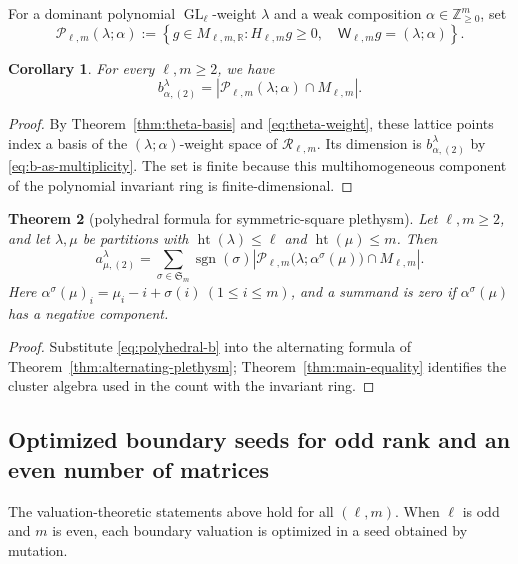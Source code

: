 \documentclass[11pt]{amsart}
\newtheorem{theorem}{Theorem}[section]
\newtheorem{corollary}[theorem]{Corollary}
\theoremstyle{definition}
\theoremstyle{remark}
\newcommand{\GL}{\operatorname{GL}}
\newcommand{\htp}{\operatorname{ht}}
\newcommand{\cR}{\mathcal R}
\newcommand{\frakS}{\mathfrak S}
\begin{document}
For a dominant polynomial $\GL_\ell$-weight $\lambda$ and a weak composition
$\alpha\in\mathbb Z_{\ge0}^m$, set
\[ \mathscr P_{\ell,m}(\lambda;\alpha) :=\left\{g\in M_{\ell,m,\mathbb R}: H_{\ell,m}g\ge0, \quad \mathsf W_{\ell,m}g=(\lambda;\alpha) \right\}. \]

\begin{corollary}\label{cor:polyhedral-b}
For every $\ell,m\ge2$, we have
\begin{equation}
 b_{\alpha,(2)}^\lambda
 =\left|\mathscr P_{\ell,m}(\lambda;\alpha)\cap M_{\ell,m}\right|.
 \label{eq:polyhedral-b}
\end{equation}
\end{corollary}

\begin{proof}
By Theorem~\ref{thm:theta-basis} and \eqref{eq:theta-weight}, these
lattice points index a basis of the $(\lambda;\alpha)$-weight space of
$\cR_{\ell,m}$.  Its dimension is $b_{\alpha,(2)}^\lambda$ by
\eqref{eq:b-as-multiplicity}.  The set is finite because this
multihomogeneous component of the polynomial invariant ring is
finite-dimensional.
\end{proof}

\begin{theorem}[polyhedral formula for symmetric-square plethysm]
\label{thm:polyhedral-plethysm}
Let $\ell,m\ge2$, and let $\lambda,\mu$ be partitions with
$\htp(\lambda)\le\ell$ and $\htp(\mu)\le m$.  Then
\[  a_{\mu,(2)}^\lambda =\sum_{\sigma\in\frakS_m}\operatorname{sgn}(\sigma) \left| \mathscr P_{\ell,m} \bigl(\lambda;\alpha^\sigma(\mu)\bigr) \cap M_{\ell,m} \right|. \]
Here $\alpha^\sigma(\mu)_i=\mu_i-i+\sigma(i) \ (1\le i\le m)$,
and a summand is zero if $\alpha^\sigma(\mu)$ has a negative component.
\end{theorem}

\begin{proof}
Substitute \eqref{eq:polyhedral-b} into the alternating formula of
Theorem~\ref{thm:alternating-plethysm}; Theorem~\ref{thm:main-equality}
identifies the cluster algebra used in the count with the invariant ring.
\end{proof}

\subsection{Optimized boundary seeds for odd rank and an even number of matrices}

The valuation-theoretic statements above hold for all $(\ell,m)$.  When
$\ell$ is odd and $m$ is even, each boundary valuation is optimized in a
seed obtained by mutation.
\end{document}
